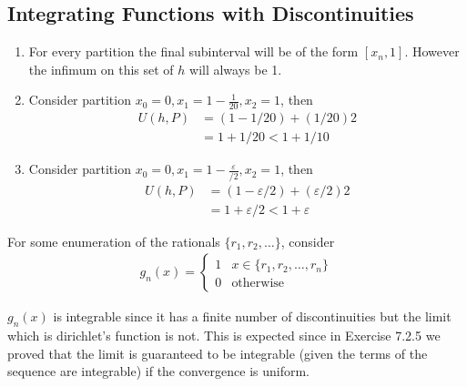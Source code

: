 \subsection{Integrating Functions with Discontinuities}

\begin{enumerate}[label=(\alph*)]
    \item 
    For every partition the final subinterval will be of the form 
    $[x_n,1]$. However the infimum on this set of $h$ will always be 
    1.

    \item
    Consider partition $x_0=0, x_1=1-\frac{1}{20},x_2=1$, then 
    \begin{align*}
        U(h,P) &= (1-1/20)+(1/20)2 \\
        &= 1 + 1/20 < 1+1/10
    \end{align*}

    \item
    Consider partition $x_0=0, x_1=1-\frac{\varepsilon}{/2},x_2=1$, then 
    \begin{align*}
        U(h,P) &= (1-\varepsilon/2)+(\varepsilon/2)2 \\
        &= 1 + \varepsilon/2 < 1+\varepsilon
    \end{align*}
\end{enumerate}

For some enumeration of the rationals $\{r_1, r_2, \dots\}$, consider 
\begin{align*}
    g_n(x) = \begin{cases}
        1 & x\in \{r_1, r_2, \dots, r_n\} \\
        0 & \text{otherwise}
    \end{cases}
\end{align*}

$g_n(x)$ is integrable since it has a finite number of discontinuities
but the limit which is dirichlet's function is not. This is expected since 
in Exercise 7.2.5 we proved that the limit is guaranteed to be 
integrable (given the terms of the sequence are integrable)
if the convergence is uniform. 


